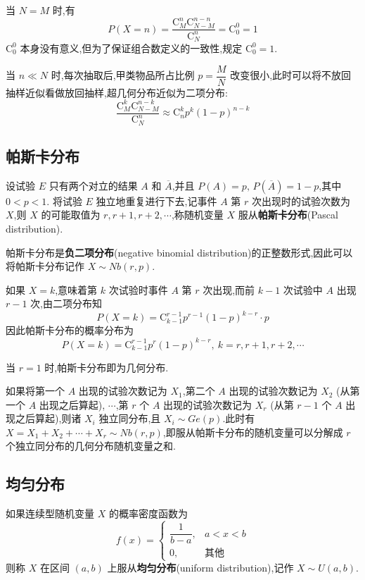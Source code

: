 \begin{note}
    \indent 当 $N=M$ 时,有
    $$
    P(X=n) = \dfrac{\mathrm{C}_M^n \mathrm{C}_{N-M}^{n-n}}{\mathrm{C}_N^n} = \mathrm{C}_0^0 = 1
    $$
    $\mathrm{C}_0^0$ 本身没有意义,但为了保证组合数定义的一致性,规定 $\mathrm{C}_0^0 = 1$.
\end{note}

当 $n \ll N$ 时,每次抽取后,甲类物品所占比例 $p = \dfrac{M}{N}$ 改变很小,此时可以将不放回抽样近似看做放回抽样,超几何分布近似为二项分布:
$$
\dfrac{\mathrm{C}_M^k \mathrm{C}_{N-M}^{n-k}}{\mathrm{C}_N^n} \approx \mathrm{C}_n^k p^k (1-p)^{n-k}
$$

\subsection{帕斯卡分布}

设试验 $E$ 只有两个对立的结果 $A$ 和 $\overline{A}$,并且 $P(A)=p, \, P(\overline{A})=1-p$,其中 $0<p<1$. 将试验 $E$ 独立地重复进行下去,记事件 $A$ 第 $r$ 次出现时的试验次数为 $X$,则 $X$ 的可能取值为 $r, r+1, r+2, \cdots$,称随机变量 $X$ 服从\textbf{帕斯卡分布}(Pascal distribution).

帕斯卡分布是\textbf{负二项分布}(negative binomial distribution)的正整数形式,因此可以将帕斯卡分布记作 $X \sim Nb(r,p)$.

如果 $X=k$,意味着第 $k$ 次试验时事件 $A$ 第 $r$ 次出现,而前 $k-1$ 次试验中 $A$ 出现 $r-1$ 次,由二项分布知
$$
P(X=k) = \mathrm{C}_{k-1}^{r-1} p^{r-1} (1-p)^{k-r} \cdot p
$$
因此帕斯卡分布的概率分布为
$$
P(X=k) = \mathrm{C}_{k-1}^{r-1} p^r (1-p)^{k-r},\ k = r, r+1, r+2, \cdots
$$

当 $r=1$ 时,帕斯卡分布即为几何分布.

如果将第一个 $A$ 出现的试验次数记为 $X_1$,第二个 $A$ 出现的试验次数记为 $X_2$ (从第一个 $A$ 出现之后算起), $\cdots$,第 $r$ 个 $A$ 出现的试验次数记为 $X_r$ (从第 $r-1$ 个 $A$ 出现之后算起),则诸 $X_i$ 独立同分布,且 $X_i \sim Ge(p)$.此时有 $X = X_1 + X_2 + \cdots + X_r \sim Nb(r,p)$,即服从帕斯卡分布的随机变量可以分解成 $r$ 个独立同分布的几何分布随机变量之和.

\subsection{均匀分布}

\begin{definition}
    \indent 如果连续型随机变量 $X$ 的概率密度函数为
    $$
    f(x)=\begin{cases}
        \dfrac{1}{b-a}, & a<x<b \\[0.5em]
        0, & \text{其他}
    \end{cases}
    $$
    则称 $X$ 在区间 $(a,b)$ 上服从\textbf{均匀分布}(uniform distribution),记作 $X \sim U(a,b)$.
\end{definition}

